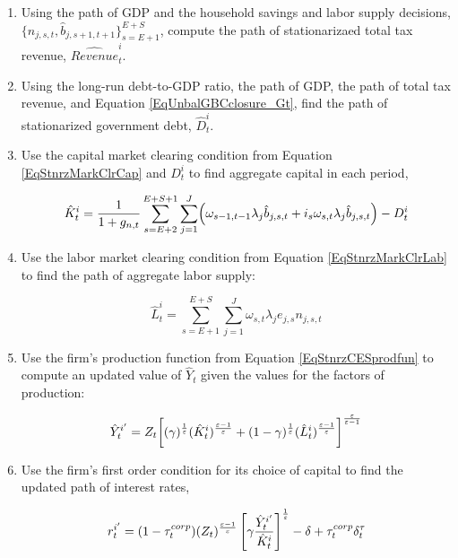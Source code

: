 \begin{enumerate}
\begin{enumerate}
\begin{enumerate}
    			\item Using the path of GDP and the household savings and labor supply decisions, $\{n_{j,s,t},\hat{b}_{j,s+1,t+1}\}_{s=E+1}^{E+S}$, compute the path of stationarizaed total tax revenue, $\hat{Revenue}_{t}^{i}$.
    			\item Using the long-run debt-to-GDP ratio, the path of GDP, the path of total tax revenue, and Equation \eqref{EqUnbalGBCclosure_Gt}, find the path of stationarized government debt, $\hat{D}_{t}^{i}$.
    			\item Use the capital market clearing condition from Equation \eqref{EqStnrzMarkClrCap} and $D_{t}^{i}$ to find aggregate capital in each period,

    			\begin{equation*}
    				\hat{K}_{t}^{i}=\frac{1}{1 + g_{n,t}}\sum_{s=E+2}^{E+S+1}\sum_{j=1}^{J}\Bigl(\omega_{s-1,t-1}\lambda_j \hat{b}_{j,s,t} + i_s\omega_{s,t}\lambda_j \hat{b}_{j,s,t}\Bigr) - D_{t}^{i}
    			\end{equation*}

    		\item Use the labor market clearing condition from Equation \eqref{EqStnrzMarkClrLab} to find the path of aggregate labor supply:

    			\begin{equation*}
    				\hat{L}_{t}^{i}=\sum_{s=E+1}^{E+S}\sum_{j=1}^{J} \omega_{s,t}\lambda_j e_{j,s}n_{j,s,t}
    			\end{equation*}

    		\item Use the firm's production function from Equation \eqref{EqStnrzCESprodfun} to compute an updated value of $\hat{Y}_{t}$ given the values for the factors of production:

    		\begin{equation*}
    			\hat{Y}_{t}^{i'} = Z_{t}\biggl[(\gamma)^\frac{1}{\varepsilon}(\hat{K}_{t}^{i})^\frac{\varepsilon-1}{\varepsilon} + (1-\gamma)^\frac{1}{\varepsilon}(\hat{L}_{t}^{i})^\frac{\varepsilon-1}{\varepsilon}\biggr]^\frac{\varepsilon}{\varepsilon-1}
    		\end{equation*}

    		\item Use the firm's first order condition for its choice of capital to find the updated path of interest rates,

    		\begin{equation*}
    			r_{t}^{i'} = (1 - \tau_{t}^{corp})(Z_{t})^\frac{\varepsilon-1}{\varepsilon}\left[\gamma\frac{\hat{Y}_{t}^{i'}}{\hat{K}_{t}^{i}}\right]^\frac{1}{\varepsilon} - \delta + \tau_{t}^{corp}\delta_{t}^\tau
    		\end{equation*}


\end{enumerate}
\end{enumerate}
\end{enumerate}
